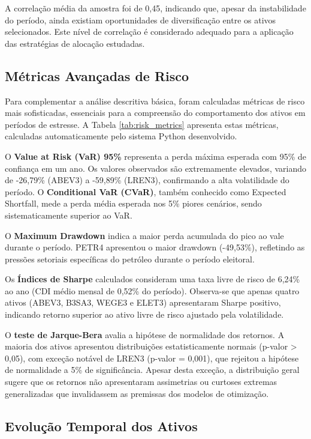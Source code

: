 A correlação média da amostra foi de 0,45, indicando que, apesar da instabilidade do período, ainda existiam oportunidades de diversificação entre os ativos selecionados. Este nível de correlação é considerado adequado para a aplicação das estratégias de alocação estudadas.

\subsection{Métricas Avançadas de Risco}

Para complementar a análise descritiva básica, foram calculadas métricas de risco mais sofisticadas, essenciais para a compreensão do comportamento dos ativos em períodos de estresse. A Tabela \ref{tab:risk_metrics} apresenta estas métricas, calculadas automaticamente pelo sistema Python desenvolvido.



O \textbf{Value at Risk (VaR) 95\%} representa a perda máxima esperada com 95\% de confiança em um ano. Os valores observados são extremamente elevados, variando de -26,79\% (ABEV3) a -59,89\% (LREN3), confirmando a alta volatilidade do período. O \textbf{Conditional VaR (CVaR)}, também conhecido como Expected Shortfall, mede a perda média esperada nos 5\% piores cenários, sendo sistematicamente superior ao VaR.

O \textbf{Maximum Drawdown} indica a maior perda acumulada do pico ao vale durante o período. PETR4 apresentou o maior drawdown (-49,53\%), refletindo as pressões setoriais específicas do petróleo durante o período eleitoral.

Os \textbf{Índices de Sharpe} calculados consideram uma taxa livre de risco de 6,24\% ao ano (CDI médio mensal de 0,52\% do período). Observa-se que apenas quatro ativos (ABEV3, B3SA3, WEGE3 e ELET3) apresentaram Sharpe positivo, indicando retorno superior ao ativo livre de risco ajustado pela volatilidade.

O \textbf{teste de Jarque-Bera} avalia a hipótese de normalidade dos retornos. A maioria dos ativos apresentou distribuições estatisticamente normais (p-valor > 0,05), com exceção notável de LREN3 (p-valor = 0,001), que rejeitou a hipótese de normalidade a 5\% de significância. Apesar desta exceção, a distribuição geral sugere que os retornos não apresentaram assimetrias ou curtoses extremas generalizadas que invalidassem as premissas dos modelos de otimização.

\subsection{Evolução Temporal dos Ativos}

